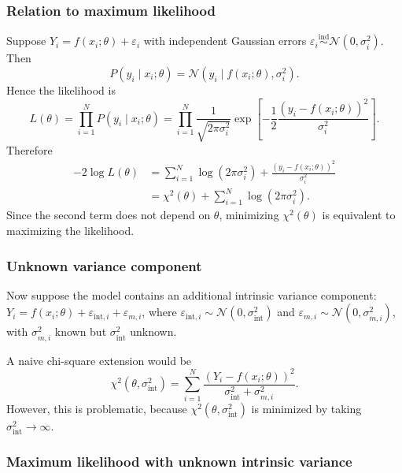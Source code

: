 \documentclass[11pt, titlepage]{article} %
\numberwithin{equation}{section}
\theoremstyle{definition}
\numberwithin{assumption}{section}
\begin{document}
\subsubsection*{Relation to maximum likelihood}

Suppose
$Y_i=f(x_i;\theta)+\varepsilon_i$
with independent Gaussian errors
$\varepsilon_i \overset{\mathrm{ind}}{\sim} \mathcal{N}(0,\sigma_i^2)$.
Then
\begin{equation*}
    P(y_i\mid x_i;\theta)
    =
    \mathcal{N}\!\left(y_i \mid f(x_i;\theta),\sigma_i^2\right).
\end{equation*}
Hence the likelihood is
\begin{equation*}
    L(\theta)
    =
    \prod_{i=1}^N P(y_i\mid x_i;\theta)
    =
    \prod_{i=1}^N
    \frac{1}{\sqrt{2\pi\sigma_i^2}}
    \exp\!\left[
    -\frac12\frac{(y_i-f(x_i;\theta))^2}{\sigma_i^2}
    \right].
\end{equation*}
Therefore
\begin{align*}
    -2\log L(\theta)
    &=
    \sum_{i=1}^N
    \log(2\pi\sigma_i^2)
    +
    \frac{(y_i-f(x_i;\theta))^2}{\sigma_i^2}\\
    &=
    \chi^2(\theta)
    +
    \sum_{i=1}^N \log(2\pi\sigma_i^2).
\end{align*}
Since the second term does not depend on $\theta$, minimizing $\chi^2(\theta)$ is equivalent to maximizing the likelihood.

\subsubsection*{Unknown variance component}

Now suppose the model contains an additional intrinsic variance component:
$Y_i=f(x_i;\theta)+\varepsilon_{\mathrm{int},i}+\varepsilon_{m,i}$,
where
$\varepsilon_{\mathrm{int},i}\sim \mathcal{N}(0,\sigma_{\mathrm{int}}^2)$
and
$\varepsilon_{m,i}\sim \mathcal{N}(0,\sigma_{m,i}^2)$,
with $\sigma_{m,i}^2$ known but $\sigma_{\mathrm{int}}^2$ unknown.

A naive chi-square extension would be
\begin{equation*}
    \chi^2(\theta,\sigma_{\mathrm{int}}^2)
    =
    \sum_{i=1}^N
    \frac{(Y_i-f(x_i;\theta))^2}{\sigma_{\mathrm{int}}^2+\sigma_{m,i}^2}.
\end{equation*}
However, this is problematic, because $\chi^2(\theta,\sigma_{\mathrm{int}}^2)$ is minimized by taking
$\sigma_{\mathrm{int}}^2\to\infty$.

\subsubsection*{Maximum likelihood with unknown intrinsic variance}
\end{document}
